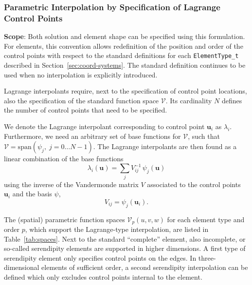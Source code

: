 \documentclass[11pt,letterpaper]{article}
\newenvironment{v2quote}
  {\begin{v2quoteframe}%
   \noindent{\footnotesize\sffamily\bfseries\color{cgnsblue}v2 text}%
   \nopagebreak\par\nopagebreak\vspace{0.15em}}
  {\end{v2quoteframe}}
\begin{document}
\subsubsection{Parametric Interpolation by Specification of Lagrange Control Points}
\label{sec:lagrange}

\begin{v2quote}
\textbf{Scope}: Both solution and element shape can be specified using this formulation.  For
elements, this convention allows redefinition of the position and order of the control points with
respect to the standard definitions for each \texttt{ElementType\_t} described in Section~\ref{sec:coord-systems}.
The standard definition continues to be used when no interpolation is explicitly introduced.

Lagrange interpolants require, next to the specification of control point locations, also the
specification of the standard function space $\mathcal{V}$.  Its cardinality $N$ defines the
number of control points that need to be specified.

We denote the Lagrange interpolant corresponding to control point $\mathbf{u}_i$ as
$\lambda_i$\footnotemark[\thefootnote].  Furthermore, we need an arbitrary set of base functions for $\mathcal{V}$, such
that $\mathcal{V} = \mathrm{span}(\psi_j,\; j = 0\ldots N-1)$.  The Lagrange interpolants are
then found as a linear combination of the base functions
%
\begin{equation}
  \lambda_i(\mathbf{u}) = \sum_j V^{-1}_{ij}\, \psi_j(\mathbf{u})
\end{equation}
%
using the inverse of the Vandermonde matrix $V$ associated to the control points $\mathbf{u}_i$
and the basis $\psi$,
%
\begin{equation}
  V_{ij} = \psi_j(\mathbf{u}_i).
\end{equation}

The (spatial) parametric function spaces $\mathcal{V}_p(u,v,w)$ for each element type and order
$p$, which support the Lagrange-type interpolation, are listed in Table~\ref{tab:spaces}.  Next
to the standard ``complete'' element, also incomplete, or so-called serendipity elements are
supported in higher dimensions.  A first type of serendipity element only specifies control
points on the edges.  In three-dimensional elements of sufficient order, a second serendipity
interpolation can be defined which only excludes control points internal to the element.
\end{v2quote}
\end{document}
